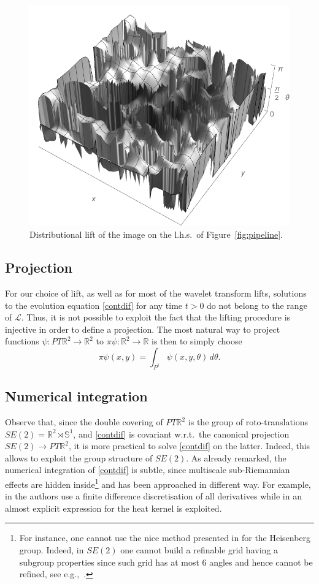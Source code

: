 \documentclass[proc]{edpsmath}
\begin{document}
\begin{figure}
  \includegraphics[width = .4\textwidth]{imgs/lift-distr-eye.pdf}
  \caption{Distributional lift of the image on the l.h.s.\ of Figure~\ref{fig:pipeline}.}
  \label{fig:distr-lift}
\end{figure}

\subsection{Projection}

For our choice of lift, as well as for most of the wavelet transform lifts, solutions to the evolution equation \eqref{contdif} for any time $t>0$ do not belong to the range of $\mathcal L$. Thus, it is not possible to exploit the fact that the lifting procedure is injective in order to define a projection. The most natural way to project functions $\psi:PT\mathbb R^2\to \mathbb R^2$ to $\pi\psi:\mathbb R^2\to \mathbb R$ is then to simply choose
\begin{equation}
  \pi \psi (x,y) = \int_{P^1} \psi(x,y,\theta)\,d\theta.
\end{equation}

\subsection{Numerical integration}

Observe that, since the double covering of $PT\mathbb R^2$ is the group of roto-translations $SE(2)=\mathbb R^2\rtimes\mathbb S^1$, and \eqref{contdif} is covariant w.r.t.\ the canonical projection $SE(2)\to PT\mathbb R^2$, it is more practical to solve \eqref{contdif} on the latter. Indeed, this allows to exploit the group structure of $SE(2)$.
As already remarked, the numerical integration of \eqref{contdif} is subtle, since multiscale sub-Riemannian effects are hidden inside\footnote{For instance, one cannot use the nice method presented in \cite{achdou} for the Heisenberg group. Indeed, in $SE(2)$ one cannot build a refinable grid having a subgroup properties since such grid has at most 6 angles and hence cannot be refined, see e.g.,~\cite{brezzloff}.}
and has been approached in different way. For example, in \cite{citti-sarti,Sanguinetti} the authors use a finite difference discretisation of all derivatives while in \cite{Duits2008,Duits2010,Duits2010a} an almost explicit expression for the heat kernel is exploited.
\end{document}
